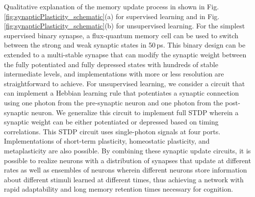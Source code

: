 \documentclass[aip,amsmath,amssymb,reprint,nofootinbib]{revtex4-1}
\begin{document}
Qualitative explanation of the memory update process in shown in Fig.\,\ref{fig:synapticPlasticity_schematic}(a) for supervised learning and in Fig.\,\ref{fig:synapticPlasticity_schematic}(b) for unsupervised learning. For the simplest supervised binary synapse, a flux-quantum memory cell can be used to switch between the strong and weak synaptic states in 50\,ps. This binary design can be extended to a multi-stable synapse that can modify the synaptic weight between the fully potentiated and fully depressed states with hundreds of stable intermediate levels, and implementations with more or less resolution are straightforward to achieve. For unsupervised learning, we consider a circuit that can implement a Hebbian learning rule that potentiates a synaptic connection using one photon from the pre-synaptic neuron and one photon from the post-synaptic neuron. We generalize this circuit to implement full STDP wherein a synaptic weight can be either potentiated or depressed based on timing correlations. This STDP circuit uses single-photon signals at four ports. Implementations of short-term plasticity, homeostatic plasticity, and metaplasticity are also possible. By combining these synaptic update circuits, it is possible to realize neurons with a distribution of synapses that update at different rates as well as ensembles of neurons wherein different neurons store information about different stimuli learned at different times, thus achieving a network with rapid adaptability and long memory retention times necessary for cognition. 
	
\end{document}
